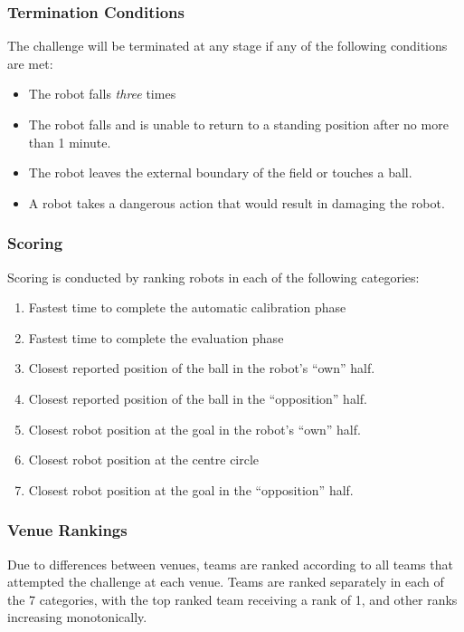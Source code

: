 \subsubsection{Termination Conditions}

The challenge will be terminated at any stage if any of the following conditions are met:
\begin{itemize}
    \item The robot falls \textit{three} times
    \item The robot falls and is unable to return to a standing position after no more than 1 minute.
    \item The robot leaves the external boundary of the field or touches a ball.
    \item A robot takes a dangerous action that would result in damaging the robot. %
\end{itemize}

\subsubsection{Scoring}

Scoring is conducted by ranking robots in each of the following categories:
\begin{enumerate}
    \item Fastest time to complete the automatic calibration phase
    \item Fastest time to complete the evaluation phase
    \item Closest reported position of the ball in the robot's ``own'' half.
    \item Closest reported position of the ball in the ``opposition'' half.
    \item Closest robot position at the goal in the robot's ``own'' half.
    \item Closest robot position at the centre circle
    \item Closest robot position at the goal in the ``opposition'' half.
\end{enumerate} 

\subsubsection{Venue Rankings}
Due to differences between venues, teams are ranked according to all teams that attempted the challenge at each venue. Teams are ranked separately in each of the 7 categories, with the top ranked team receiving a rank of 1, and other ranks increasing monotonically.

